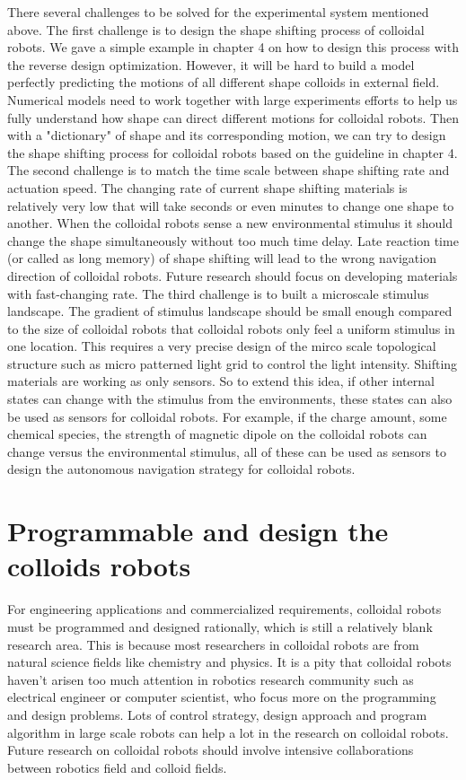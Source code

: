 There several challenges to be solved for the experimental system mentioned above. The first challenge  is to design the shape shifting process of colloidal robots. We gave a simple example in chapter 4 on how to design this process with the reverse design optimization. However, it will be hard to build a model perfectly predicting the motions of all different shape colloids in external field. Numerical models need to work together with large experiments efforts to help us fully understand how shape can direct different motions for colloidal robots\autocite{lee2019directed}. Then with a "dictionary" of shape and its corresponding motion, we can try to design the shape shifting process for colloidal robots based on the guideline in chapter 4. The second challenge is to match the time scale between shape shifting rate and actuation speed. The changing rate of current shape shifting materials is relatively very low that will take seconds or even minutes to change one shape to another. When the colloidal robots sense a new environmental stimulus it should change the shape simultaneously without too  much time delay. Late reaction time (or called as long memory) of shape shifting will  lead to the wrong navigation direction of colloidal robots. Future research should focus on developing materials with fast-changing rate. The third challenge is to built a microscale stimulus landscape. The gradient of stimulus landscape should be small enough compared to the size of colloidal robots that colloidal robots only feel a uniform stimulus in one location. This requires a very precise  design of the mirco scale topological structure such as micro patterned light grid to control the light intensity. Shifting materials are working as only sensors. So to extend this idea, if other internal states can change with the stimulus from the environments, these states can also be used as sensors for colloidal robots. For example, if the charge amount, some chemical species, the strength of magnetic dipole on the colloidal robots can change versus the environmental stimulus, all of these can be used as sensors to design the autonomous navigation strategy for colloidal robots.  




\section{Programmable and design the colloids robots}
For engineering applications and commercialized requirements, colloidal robots must be programmed and designed rationally, which is still a relatively blank research area. This is because most researchers in colloidal robots are from natural science fields like chemistry and physics. It is a pity that colloidal robots haven't arisen too much attention in robotics research community such as electrical engineer or computer scientist, who focus more on the programming and design problems\autocite{das2019cellular}.  Lots of control strategy, design approach and program algorithm in large scale robots can help a lot in the research on colloidal robots.  Future research on colloidal robots should involve intensive collaborations between robotics field and colloid fields.

